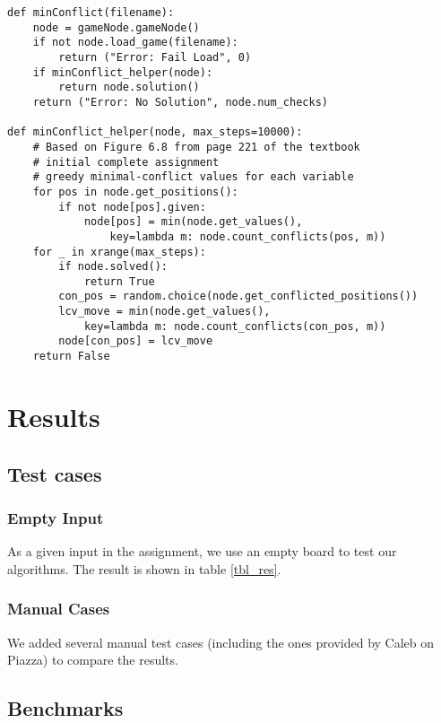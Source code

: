 \documentclass[11pt]{article}
\begin{document}
\lstset{language=Python}
\begin{lstlisting}[frame=single]
def minConflict(filename):
	node = gameNode.gameNode()
	if not node.load_game(filename):
		return ("Error: Fail Load", 0)
	if minConflict_helper(node):
		return node.solution()
	return ("Error: No Solution", node.num_checks)

def minConflict_helper(node, max_steps=10000):
	# Based on Figure 6.8 from page 221 of the textbook
	# initial complete assignment
	# greedy minimal-conflict values for each variable
	for pos in node.get_positions():
		if not node[pos].given:
			node[pos] = min(node.get_values(),
				key=lambda m: node.count_conflicts(pos, m))
	for _ in xrange(max_steps):
		if node.solved():
			return True
		con_pos = random.choice(node.get_conflicted_positions())
		lcv_move = min(node.get_values(),
			key=lambda m: node.count_conflicts(con_pos, m))
		node[con_pos] = lcv_move
	return False
\end{lstlisting}

\section{Results}

\subsection{Test cases}

\subsubsection{Empty Input}

As a given input in the assignment, we use an empty board to test our algorithms.
The result is shown in table \ref{tbl_res}.

\subsubsection{Manual Cases}

We added several manual test cases (including the ones provided by Caleb on
Piazza) to compare the results.

\subsection{Benchmarks}
\end{document}
